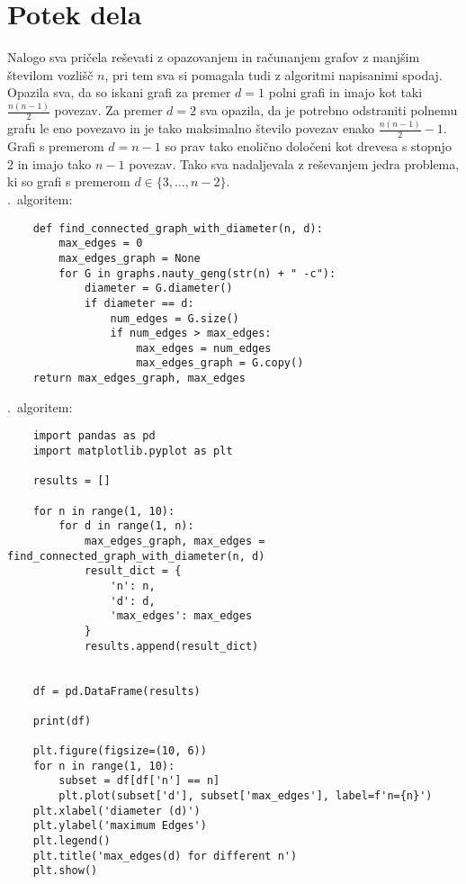 \documentclass[12pt,a4paper]{amsart}
\theoremstyle{definition} %
\theoremstyle{plain} %
\begin{document}
\section{Potek dela}

Nalogo sva pričela reševati z opazovanjem in računanjem grafov z manjšim številom vozlišč $n$, pri tem sva si
pomagala tudi z algoritmi napisanimi spodaj. Opazila sva, da so iskani grafi za premer $d = 1$ polni grafi in
imajo kot taki $\frac{n (n - 1)}{2}$ povezav. Za premer $d = 2$ sva opazila, da je potrebno odstraniti
polnemu grafu le eno povezavo in je tako maksimalno število povezav enako $\frac{n (n - 1)}{2} - 1$. Grafi s
premerom $d = n - 1$ so prav tako enolično določeni kot drevesa s stopnjo 2 in imajo tako $n - 1$ povezav.
Tako sva nadaljevala z reševanjem jedra problema, ki so grafi s premerom $d \in \{3, \dots, n - 2\}$.\\

.\ algoritem:
\begin{verbatim}
    def find_connected_graph_with_diameter(n, d):
        max_edges = 0
        max_edges_graph = None
        for G in graphs.nauty_geng(str(n) + " -c"):
            diameter = G.diameter()
            if diameter == d:
                num_edges = G.size()
                if num_edges > max_edges:
                    max_edges = num_edges
                    max_edges_graph = G.copy()
    return max_edges_graph, max_edges

\end{verbatim}
.\ algoritem:
\begin{verbatim}
    import pandas as pd
    import matplotlib.pyplot as plt
    
    results = []
    
    for n in range(1, 10):
        for d in range(1, n):
            max_edges_graph, max_edges = find_connected_graph_with_diameter(n, d)
            result_dict = {
                'n': n,
                'd': d,
                'max_edges': max_edges
            }
            results.append(result_dict)
    
    
    df = pd.DataFrame(results)
    
    print(df)
    
    plt.figure(figsize=(10, 6))
    for n in range(1, 10):
        subset = df[df['n'] == n]
        plt.plot(subset['d'], subset['max_edges'], label=f'n={n}')
    plt.xlabel('diameter (d)')
    plt.ylabel('maximum Edges')
    plt.legend()
    plt.title('max_edges(d) for different n')
    plt.show()


\end{verbatim}
\end{document}
